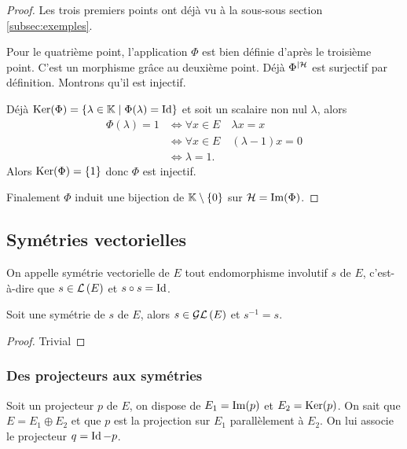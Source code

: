 \begin{proof}
  Les trois premiers points ont déjà vu à la sous-sous section~
  \ref{subsec:exemples}.

  Pour le quatrième point, l'application \(\Phi\) est bien définie d'après le troisième point. C'est un morphisme grâce au deuxième point. Déjà \(\Phi^{|\mathcal{H}}\) est surjectif par définition. Montrons qu'il est injectif.

  Déjà \(\operatorname{Ker}(\Phi)=\left\{\lambda \in \mathbb{K}\mathrel{}\middle|\mathrel{}\Phi(\lambda)=\operatorname{Id}\right\}\) et soit un scalaire non nul \(\lambda\), alors
  \begin{align}
    \Phi(\lambda) = 1 &\iff \forall x \in E \quad \lambda x=x\\
                      &\iff \forall x \in E \quad (\lambda-1)x=0\\
                      &\iff \lambda=1.
  \end{align}
  Alors  \(\operatorname{Ker}(\Phi)=\{1\}\) donc \(\Phi\) est injectif.

  Finalement \(\Phi\) induit une bijection de \(\mathbb{K}\setminus\{0\}\) sur \(\mathcal{H}=\operatorname{Im}(\Phi)\).
\end{proof}

\subsection{Symétries vectorielles}

\begin{defdef}
  On appelle symétrie vectorielle de \(E\) tout endomorphisme involutif \(s\) de \(E\), c'est-à-dire que \(s \in \mathcal{L}\left(E\right)\) et \(s \circ s = \operatorname{Id}\).
\end{defdef}

\begin{prop}
  Soit une symétrie de \(s\) de \(E\), alors \(s \in \mathcal{GL}\left(E\right)\) et \(s^{-1}=s\).
\end{prop}
\begin{proof}
  Trivial
\end{proof}

\subsubsection{Des projecteurs aux symétries}

Soit un projecteur \(p\) de \(E\), on dispose de \(E_1=\operatorname{Im}(p)\) et \(E_2=\operatorname{Ker}(p)\). On sait que \(E=E_1 \oplus E_2\) et que \(p\) est la projection sur \(E_1\) parallèlement à \(E_2\). On lui associe le projecteur \(q=\operatorname{Id}-p\).

